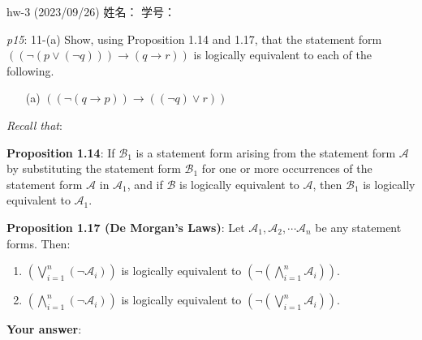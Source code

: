 \documentclass[UTF8,12pt,a4paper]{ctexart}
\begin{document}
	

\begin{center}
hw-3 (2023/09/26) \qquad\qquad 姓名：  \hspace{7em}  学号： 
\end{center}



\emph{p15}: 11-(a) \qquad
Show, using Proposition 1.14 and 1.17, that the statement form   \\
$(  (\neg (p \lor (\neg q)))  \to  (q \to r) )$
is logically equivalent to each of the following.

\begin{enumerate}
	\item[(a)] $ ( (\neg (q \to p)) \to ((\neg q) \lor r )) $
\end{enumerate}


\dotfill
\textit{Recall that}:
\dotfill

{\small 
	\textbf{Proposition 1.14}:
If $\mathscr{B}_1$ is a statement form arising from the statement form $\mathscr{A}$ 
by substituting the statement form $\mathscr{B}_1$ for one or more occurrences of the
statement form $\mathscr{A}$ in $\mathscr{A}_1$, 
and if $\mathscr{B}$ is logically equivalent to $\mathscr{A}$, 
then $\mathscr{B}_1$ is logically equivalent to $\mathscr{A}_1$.

	\textbf{Proposition 1.17 (De Morgan's Laws)}: 
Let $\mathscr{A}_1, \mathscr{A}_2, \dotsm \mathscr{A}_n$ be any statement forms. Then:
\begin{enumerate}
	\item $(\bigvee^n_{i=1} (\neg \mathscr{A}_i))$ is logically equivalent to $( \neg (\bigwedge^n_{i=1} \mathscr{A}_i))$.
	
	\item $(\bigwedge^n_{i=1} ( \neg \mathscr{A}_i))$  is logically equivalent to  $(\neg (\bigvee^n_{i=1} \mathscr{A}_i))$.
\end{enumerate}
}

\dotfill


\textbf{Your answer}:
















\end{document}
